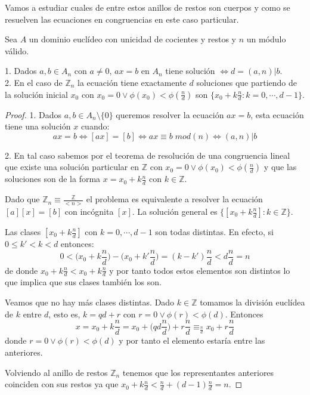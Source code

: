 Vamos a estudiar cuales de entre estos anillos de restos son cuerpos y como se resuelven las ecuaciones en congruencias en este caso particular. 

\begin{proposition}
Sea $A$ un dominio euclídeo con unicidad de cocientes y restos y $n$ un módulo válido.

1. Dados $a,b \in A_n$ con $a \neq 0$, $ax = b$ en $A_n$ tiene solución $\iff d = (a,n)|b$.\\
2. En el caso de $\mathbb{Z}_n$ la ecuación tiene exactamente $d$ soluciones que partiendo de la solución inicial $x_0$ con $x_0 = 0 \lor \phi(x_0) < \phi(\frac{n}{d})$ son $\{x_0+k\frac{n}{d}:k = 0,\cdots,d-1\}$. 
\end{proposition}
\begin{proof}
1. Dados $a,b \in A_n \setminus \{0\}$ queremos resolver la ecuación $ax = b$, esta ecuación tiene una solución $x$ cuando: $$ax = b \iff [ax] = [b] \iff ax \equiv b \; mod(n) \iff (a,n)|b$$ 

2. En tal caso sabemos por el teorema de resolución de una congruencia lineal que existe una solución particular en $\mathbb{Z}$ con $x_0 = 0 \lor \phi(x_0) < \phi(\frac{n}{d})$ y que las soluciones son de la forma $x = x_0 + k\frac{n}{d}$ con $k \in \mathbb{Z}$. 

Dado que $\mathbb{Z}_n \equiv \frac{\mathbb{Z}}{<n>}$ el problema es equivalente a resolver la ecuación $[a][x] = [b]$ con incógnita $[x]$. La solución general es $\{[x_0+k\frac{n}{d}]: k \in \mathbb{Z}\}$. 

Las clases $[x_0 + k \frac{n}{d}]$ con $k = 0,\cdots,d-1$ son todas distintas. En efecto, si $0 \le k' < k < d$ entonces: $$0 < \Big(x_0 + k\frac{n}{d}\Big) - \Big(x_0+k'\frac{n}{d}\Big) = (k-k')\frac{n}{d} < d \frac{n}{d} = n$$ de donde $x_0 + k \frac{n}{d} < x_0 + k \frac{n}{d}$ y por tanto todos estos elementos son distintos lo que implica que sus clases también los son. 

Veamos que no hay más clases distintas. Dado $k \in \mathbb{Z}$ tomamos la división euclídea de $k$ entre $d$, esto es, $k = qd+r$ con $r = 0 \lor \phi(r) < \phi(d)$. Entonces $$x = x_0 + k \frac{n}{d} = x_0 + \Big(qd \frac{n}{d}\Big) + r \frac{n}{d} \equiv_{\frac{n}{d}} x_0 + r\frac{n}{d}$$ donde $r = 0 \lor \phi(r) < \phi(d)$ y por tanto el elemento estaría entre las anteriores. 

Volviendo al anillo de restos $\mathbb{Z}_n$ tenemos que los representantes anteriores coinciden con sus restos ya que $x_0 + k \frac{n}{d} < \frac{n}{d} + (d-1) \frac{n}{d} = n$. 
\end{proof}

